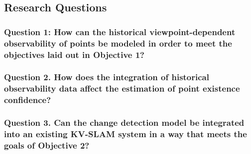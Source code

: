 \subsection{Research Questions}

\subsubsection*{Question 1: How can the historical viewpoint-dependent observability of points be modeled in order to meet the objectives laid out in Objective 1?}

\subsubsection*{Question 2. How does the integration of historical observability data affect the estimation of point existence confidence?}


\subsubsection*{Question 3. Can the change detection model be integrated into an existing KV-SLAM system in a way that meets the goals of Objective 2?}